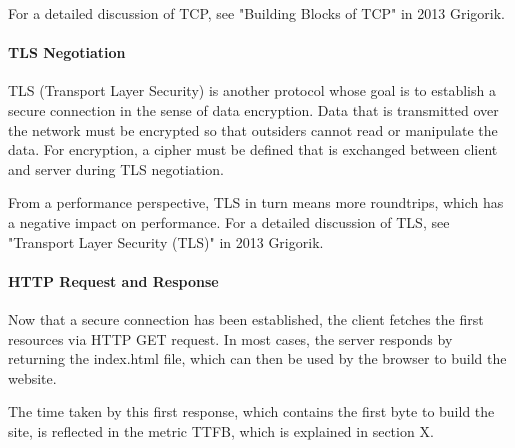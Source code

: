For a detailed discussion of TCP, see "Building Blocks of TCP" in 2013 Grigorik. %







\paragraph{TLS Negotiation} %

TLS (Transport Layer Security) is another protocol whose goal is to establish a secure connection in the sense of data encryption.
Data that is transmitted over the network must be encrypted so that outsiders cannot read or manipulate the data.
For encryption, a cipher must be defined that is exchanged between client and server during TLS negotiation. %

From a performance perspective, TLS in turn means more roundtrips, which has a negative impact on performance.
For a detailed discussion of TLS, see "Transport Layer Security (TLS)" in 2013 Grigorik. %





\paragraph{HTTP Request and Response} %

Now that a secure connection has been established, the client fetches the first resources via HTTP GET request.
In most cases, the server responds by returning the index.html file, which can then be used by the browser to build the website. %

The time taken by this first response, which contains the first byte to build the site, is reflected in the metric TTFB, which is explained in section X.



